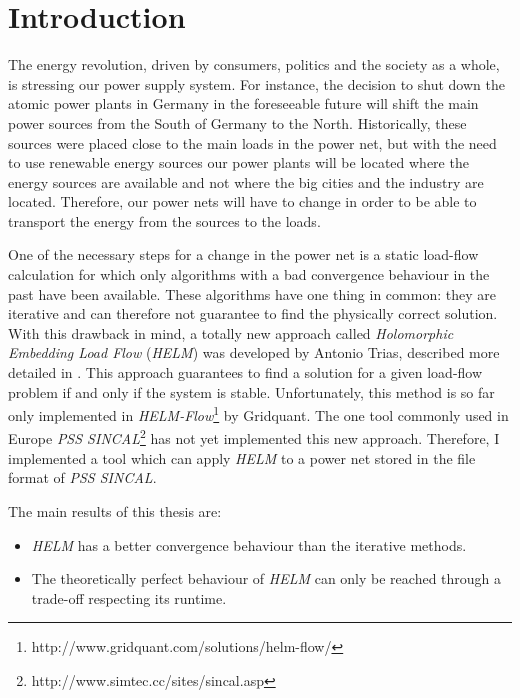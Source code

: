 \chapter{Introduction}
The energy revolution, driven by consumers, politics and the society as a whole, is stressing our power supply system. For instance, the decision to shut down the atomic power plants in Germany in the foreseeable future will shift the main power sources from the South of Germany to the North. Historically, these sources were placed close to the main loads in the power net, but with the need to use renewable energy sources our power plants will be located where the energy sources are available and not where the big cities and the industry are located. Therefore, our power nets will have to change in order to be able to transport the energy from the sources to the loads.

One of the necessary steps for a change in the power net is a static load-flow calculation for which only algorithms with a bad convergence behaviour in the past have been available. These algorithms have one thing in common: they are iterative and can therefore not guarantee to find the physically correct solution. With this drawback in mind, a totally new approach called \emph{Holomorphic Embedding Load Flow} (\emph{HELM})  \citep{helmIEEE} was developed by Antonio Trias, described more detailed in . This approach guarantees to find a solution for a given load-flow problem if and only if the system is stable. Unfortunately, this method is so far only implemented in \emph{HELM-Flow}\footnote{http://www.gridquant.com/solutions/helm-flow/} by Gridquant. The one tool commonly used in Europe \emph{PSS SINCAL}\footnote{http://www.simtec.cc/sites/sincal.asp} has not yet implemented this new approach. Therefore, I implemented a tool which can apply \emph{HELM} to a power net stored in the file format of \emph{PSS SINCAL}.

The main results of this thesis are:
\begin{itemize}
	\item \emph{HELM} has a better convergence behaviour than the iterative methods.
	\item The theoretically perfect behaviour of \emph{HELM} can only be reached through a trade-off respecting its runtime.
\end{itemize}